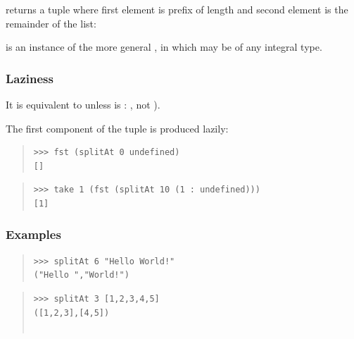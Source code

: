 \begin{haddockdesc}
\item[\begin{tabular}{@{}l}
splitAt :: Int -> {\char 91}a{\char 93} -> ({\char 91}a{\char 93}, {\char 91}a{\char 93})
\end{tabular}]
{\haddockbegindoc
{}  returns a tuple where first element is  prefix of
 length  and second element is the remainder of the list:\par
{} is an instance of the more general ,
 in which  may be of any integral type.\par
\subsubsection*{\textbf{Laziness}}
It is equivalent to 
 unless  is :
 , not ).\par
The first component of the tuple is produced lazily:\par
\begin{quote}
{\haddockverb\begin{verbatim}
>>> fst (splitAt 0 undefined)
[]

\end{verbatim}}
\end{quote}
\begin{quote}
{\haddockverb\begin{verbatim}
>>> take 1 (fst (splitAt 10 (1 : undefined)))
[1]

\end{verbatim}}
\end{quote}
\subsubsection*{\textbf{Examples}}
\begin{quote}
{\haddockverb\begin{verbatim}
>>> splitAt 6 "Hello World!"
("Hello ","World!")

\end{verbatim}}
\end{quote}
\begin{quote}
{\haddockverb\begin{verbatim}
>>> splitAt 3 [1,2,3,4,5]
([1,2,3],[4,5])


\end{verbatim}}
\end{quote}}
\end{haddockdesc}
